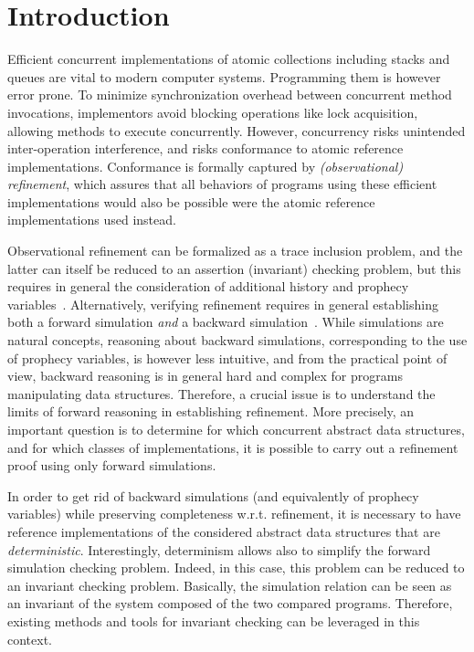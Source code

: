 \section{Introduction}
\vspace{-1mm}
Efficient concurrent implementations of atomic collections including stacks and queues are vital to modern computer systems. Programming them is however error prone. To minimize synchronization overhead between concurrent method invocations, implementors avoid blocking operations like lock acquisition, allowing methods to execute concurrently. However, concurrency risks unintended inter-operation interference, and risks conformance to atomic reference implementations. Conformance is formally captured by \emph{(observational) refinement}, which assures that all behaviors of programs
using these efficient implementations would also be possible were the atomic reference implementations used instead.

Observational refinement can be formalized as a trace inclusion problem, and the latter can itself be reduced to an assertion (invariant) checking problem, but this requires in general the consideration of additional history and prophecy variables~\cite{DBLP:journals/tcs/AbadiL91}. Alternatively, verifying refinement requires in general establishing both a forward simulation {\em and} a backward simulation~\cite{DBLP:journals/iandc/LynchV95}. While simulations are natural concepts, reasoning about backward simulations, corresponding to the use of prophecy variables, is however less intuitive, and from the practical point of view, backward reasoning is in general hard and complex for programs manipulating data structures. Therefore, a crucial issue is to understand the limits of forward reasoning in establishing refinement. More precisely, an important question is to determine for which concurrent abstract data structures, and for which classes of implementations, it is possible to carry out a refinement proof using only forward simulations.

In order to get rid of backward simulations (and equivalently of prophecy variables) while preserving completeness w.r.t. refinement, it is necessary to have reference implementations of the considered abstract data structures that are {\em deterministic}. Interestingly, determinism allows also to simplify the forward simulation checking problem. Indeed, in this case, this problem can be reduced to an invariant checking problem. Basically, the simulation relation can be seen as an invariant of the system composed of the two compared programs. Therefore, existing methods and tools for invariant checking can be leveraged in this context. %

